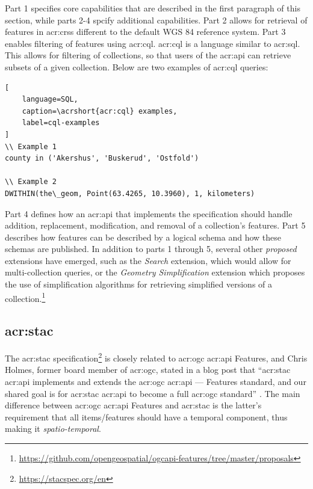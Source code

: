 Part 1 specifies core capabilities that are described in the first paragraph of this section, while parts 2-4 spcify additional capabilities. Part 2 allows for retrieval of features in \glspl{acr:crs} different to the default WGS 84 reference system. Part 3 enables filtering of features using \gls{acr:cql}. \gls{acr:cql} is a language similar to \acrshort{acr:sql}. This allows for filtering of collections, so that users of the \acrshort{acr:api} can retrieve subsets of a given collection. Below are two examples of \gls{acr:cql} queries:

\begin{lstlisting}[
    language=SQL,
    caption=\acrshort{acr:cql} examples,
    label=cql-examples
]
\\ Example 1
county in ('Akershus', 'Buskerud', 'Ostfold')

\\ Example 2
DWITHIN(the\_geom, Point(63.4265, 10.3960), 1, kilometers)
\end{lstlisting}

Part 4 defines how an \acrshort{acr:api} that implements the specification should handle addition, replacement, modification, and removal of a collection's features. Part 5 describes how features can be described by a logical schema and how these schemas are published. In addition to parts 1 through 5, several other \textit{proposed} extensions have emerged, such as the \textit{Search} extension, which would allow for multi-collection queries, or the \textit{Geometry Simplification} extension which proposes the use of simplification algorithms for retrieving simplified versions of a collection.\footnote{\url{https://github.com/opengeospatial/ogcapi-features/tree/master/proposals}}


\subsection[SpatioTemporal Asset Catalogs]{\acrlong{acr:stac}}
\label{subsec:stac}

The \gls{acr:stac} specification\footnote{\url{https://stacspec.org/en}} is closely related to \acrshort{acr:ogc} \acrshort{acr:api} Features, and Chris Holmes, former board member of \acrlong{acr:ogc}, stated in a blog post that \enquote{\acrshort{acr:stac} \acrshort{acr:api} implements and extends the \acrshort{acr:ogc} \acrshort{acr:api} — Features standard, and our shared goal is for \acrshort{acr:stac} \acrshort{acr:api} to become a full \acrshort{acr:ogc} standard} \citep{holmesSpatioTemporalAssetCatalogs2021a}. The main difference between \acrshort{acr:ogc} \acrshort{acr:api} Features and \acrshort{acr:stac} is the latter's requirement that all items/features should have a temporal component, thus making it \textit{spatio-temporal}. 

\glsresetall

